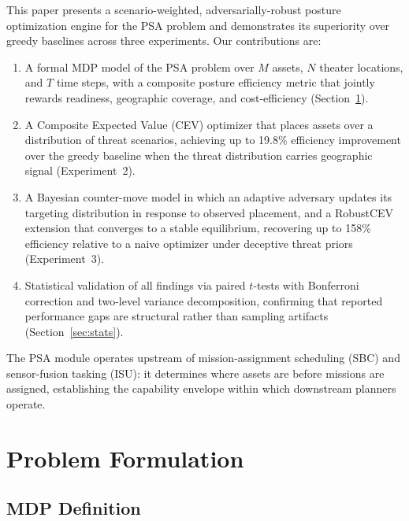 \documentclass[11pt]{article}
\begin{document}
This paper presents a scenario-weighted, adversarially-robust posture
optimization engine for the PSA problem and demonstrates its superiority
over greedy baselines across three experiments. Our contributions are:
\begin{enumerate}
    \item A formal MDP model of the PSA problem over $M$ assets,
          $N$ theater locations, and $T$ time steps, with a composite
          posture efficiency metric that jointly rewards readiness,
          geographic coverage, and cost-efficiency
          (Section~\ref{sec:formulation}).
    \item A Composite Expected Value (CEV) optimizer that places assets
          over a distribution of threat scenarios, achieving up to 19.8\%
          efficiency improvement over the greedy baseline when the threat
          distribution carries geographic signal (Experiment~2).
    \item A Bayesian counter-move model in which an adaptive adversary
          updates its targeting distribution in response to observed
          placement, and a RobustCEV extension that converges to a stable
          equilibrium, recovering up to 158\% efficiency relative to a
          naive optimizer under deceptive threat priors (Experiment~3).
    \item Statistical validation of all findings via paired $t$-tests
          with Bonferroni correction and two-level variance decomposition,
          confirming that reported performance gaps are structural rather
          than sampling artifacts (Section~\ref{sec:stats}).
\end{enumerate}

The PSA module operates upstream of mission-assignment scheduling (SBC)
and sensor-fusion tasking (ISU): it determines where assets are before
missions are assigned, establishing the capability envelope within which
downstream planners operate.


\section{Problem Formulation}
\label{sec:formulation}

\subsection{MDP Definition}
\end{document}
